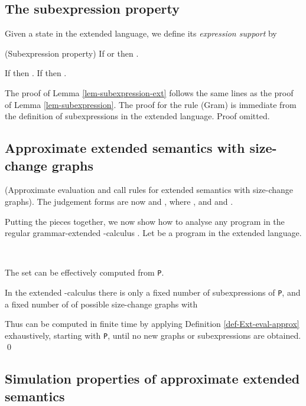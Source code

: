 \documentclass{LMCS}
\newcommand{\fl}{\noindent}
\newcommand{\bdfn}{\begin{defi}}
\newcommand{\edfn}{\end{defi}}
\newcommand{\blem}{\begin{lem}}
\newcommand{\elem}{\end{lem}}
\newcommand{\bcor}{\begin{cor}}
\newcommand{\ecor}{\end{cor}}
\newcommand{\bprf}{\proof}
\newcommand{\eprf}{\qed}
\newcommand{\bthm}{\begin{thm}}
\newcommand{\ethm}{\end{thm}}
\theoremstyle{definition}\newtheorem{env}[thm]{Environment}
\begin{document}
\subsection{The subexpression property}

\bdfn Given a state  in the extended language, we define its
{\em expression support}  by

\edfn

\blem \label{lem-subexpression-ext}
{\rm (Subexpression property)} If  or  then
.
\elem
\bcor If
 then
. If
 then
.
\ecor

The proof of Lemma \ref{lem-subexpression-ext} follows the same lines
as the proof of Lemma \ref{lem-subexpression}. The proof for the rule
(Gram) is immediate from the definition of subexpressions in the
extended language. Proof omitted.


\subsection{Approximate extended semantics with size-change graphs}
\bdfn
\label{def-Ext-eval-approx}
{\rm(Approximate evaluation and call rules for extended semantics with size-change graphs)}. 
The judgement forms are now   and
, where , and  and  .








\edfn
\medskip

Putting the pieces together, we now show how to analyse any program in the
regular grammar-extended -calculus . Let  be a program in the extended language.
\bdfn\ 

\fl 


\edfn

\bthm The set   can be effectively computed 
from {\tt P}.\ethm
\bprf 
In the extended -calculus there is only a fixed number of subexpressions of {\tt P}, and
a fixed number of  
of possible size-change graphs with 

Thus 
can be computed in finite time by applying Definition \ref{def-Ext-eval-approx}
exhaustively, starting with {\tt P}, until no new graphs or 
subexpressions are obtained.
\eprf 



\subsection{Simulation properties of approximate extended semantics}
\end{document}
